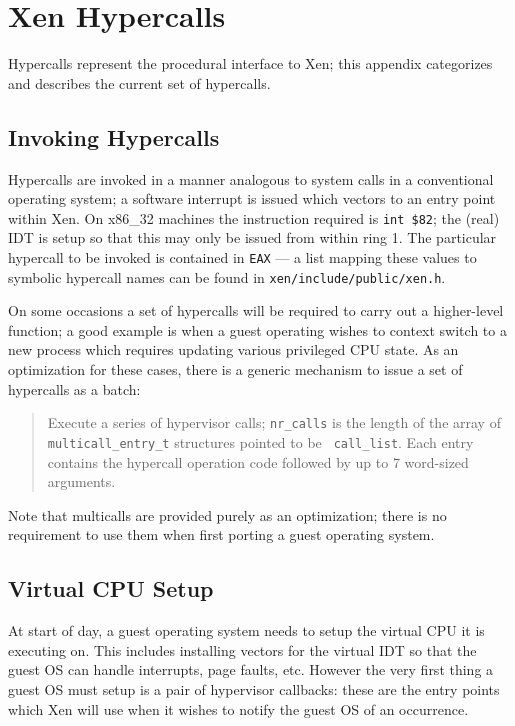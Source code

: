 
\newcommand{\hypercall}[1]{\vspace{2mm}{\sf #1}}

\chapter{Xen Hypercalls}
\label{a:hypercalls}

Hypercalls represent the procedural interface to Xen; this appendix 
categorizes and describes the current set of hypercalls. 

\section{Invoking Hypercalls} 

Hypercalls are invoked in a manner analogous to system calls in a
conventional operating system; a software interrupt is issued which
vectors to an entry point within Xen. On x86\_32 machines the
instruction required is {\tt int \$82}; the (real) IDT is setup so
that this may only be issued from within ring 1. The particular 
hypercall to be invoked is contained in {\tt EAX} --- a list 
mapping these values to symbolic hypercall names can be found 
in {\tt xen/include/public/xen.h}. 

On some occasions a set of hypercalls will be required to carry
out a higher-level function; a good example is when a guest 
operating wishes to context switch to a new process which 
requires updating various privileged CPU state. As an optimization
for these cases, there is a generic mechanism to issue a set of 
hypercalls as a batch: 

\begin{quote}
\hypercall{multicall(void *call\_list, int nr\_calls)}

Execute a series of hypervisor calls; {\tt nr\_calls} is the length of
the array of {\tt multicall\_entry\_t} structures pointed to be {\tt
call\_list}. Each entry contains the hypercall operation code followed
by up to 7 word-sized arguments.
\end{quote}

Note that multicalls are provided purely as an optimization; there is
no requirement to use them when first porting a guest operating
system.


\section{Virtual CPU Setup} 

At start of day, a guest operating system needs to setup the virtual
CPU it is executing on. This includes installing vectors for the
virtual IDT so that the guest OS can handle interrupts, page faults,
etc. However the very first thing a guest OS must setup is a pair 
of hypervisor callbacks: these are the entry points which Xen will
use when it wishes to notify the guest OS of an occurrence. 

